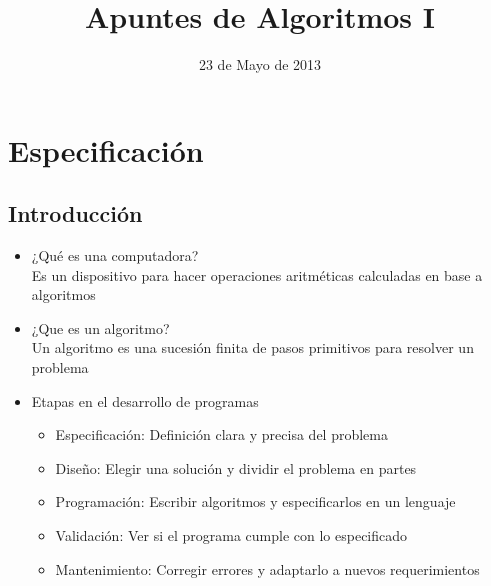 \documentclass[a4paper,10pt]{article}
\title{ Apuntes de Algoritmos I }
\date{23 de Mayo de 2013}
\begin{document}
\maketitle
\tableofcontents 
\clearpage
\section{Especificación}
\subsection{Introducción}
\begin{itemize}
	\item ¿Qué es una computadora? \\
	Es un dispositivo para hacer operaciones aritméticas calculadas en base a algoritmos
	\item ¿Que es un algoritmo? \\
	Un algoritmo es una sucesión finita de pasos primitivos para resolver un problema
	\item Etapas en el desarrollo de programas 
	\begin{itemize}
		\item Especificación: Definición clara y precisa del problema
		\item Diseño: Elegir una solución y dividir el problema en partes
		\item Programación: Escribir algoritmos y especificarlos en un lenguaje
		\item Validación: Ver si el programa cumple con lo especificado
		\item Mantenimiento: Corregir errores y adaptarlo a nuevos requerimientos
	\end{itemize}
\end{itemize}
\end{document}
